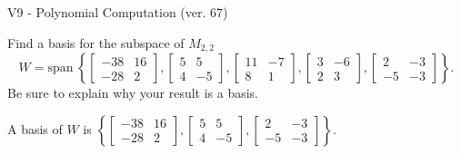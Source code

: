 \begin{exercise}
  \begin{exerciseTitle}V9 - Polynomial Computation (ver. 67)\end{exerciseTitle}
  \begin{exerciseStatement}
    Find a basis for the subspace of \(M_{2,2}\) 
\[W=\mathrm{span}\ \left\{\left[\begin{array}{cc}
-38 & 16 \\
-28 & 2
\end{array}\right] , \left[\begin{array}{cc}
5 & 5 \\
4 & -5
\end{array}\right] , \left[\begin{array}{cc}
11 & -7 \\
8 & 1
\end{array}\right] , \left[\begin{array}{cc}
3 & -6 \\
2 & 3
\end{array}\right] , \left[\begin{array}{cc}
2 & -3 \\
-5 & -3
\end{array}\right]\right\}.\]
 Be sure to explain why your result is a basis.


  \end{exerciseStatement}
  \begin{exerciseAnswer}
   A basis of \(W\) is  \(\left\{\left[\begin{array}{cc}
-38 & 16 \\
-28 & 2
\end{array}\right] , \left[\begin{array}{cc}
5 & 5 \\
4 & -5
\end{array}\right] , \left[\begin{array}{cc}
2 & -3 \\
-5 & -3
\end{array}\right]\right\}\).
  


  \end{exerciseAnswer}
\end{exercise}